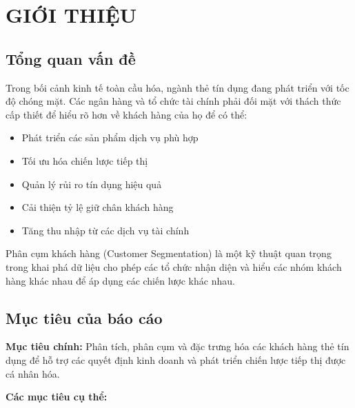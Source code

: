 \chapter{GIỚI THIỆU}

\section{Tổng quan vấn đề}

Trong bối cảnh kinh tế toàn cầu hóa, ngành thẻ tín dụng đang phát triển với tốc độ chóng mặt. Các ngân hàng và tổ chức tài chính phải đối mặt với thách thức cấp thiết để hiểu rõ hơn về khách hàng của họ để có thể:

\begin{itemize}
    \item Phát triển các sản phẩm dịch vụ phù hợp
    \item Tối ưu hóa chiến lược tiếp thị
    \item Quản lý rủi ro tín dụng hiệu quả
    \item Cải thiện tỷ lệ giữ chân khách hàng
    \item Tăng thu nhập từ các dịch vụ tài chính
\end{itemize}

Phân cụm khách hàng (Customer Segmentation) là một kỹ thuật quan trọng trong khai phá dữ liệu cho phép các tổ chức nhận diện và hiểu các nhóm khách hàng khác nhau để áp dụng các chiến lược khác nhau.

\section{Mục tiêu của báo cáo}

\textbf{Mục tiêu chính:} Phân tích, phân cụm và đặc trưng hóa các khách hàng thẻ tín dụng để hỗ trợ các quyết định kinh doanh và phát triển chiến lược tiếp thị được cá nhân hóa.

\textbf{Các mục tiêu cụ thể:}

